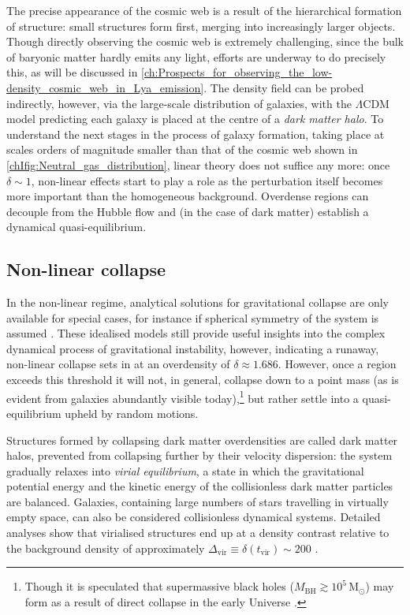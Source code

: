 The precise appearance of the cosmic web is a result of the hierarchical formation of structure: small structures form first, merging into increasingly larger objects. Though directly observing the cosmic web is extremely challenging, since the bulk of baryonic matter hardly emits any light, efforts are underway to do precisely this, as will be discussed in \cref{ch:Prospects_for_observing_the_low-density_cosmic_web_in_Lya_emission}. The density field can be probed indirectly, however, via the large-scale distribution of galaxies, with the $\Lambda$CDM model predicting each galaxy is placed at the centre of a \textit{dark matter halo}. To understand the next stages in the process of galaxy formation, taking place at scales orders of magnitude smaller than that of the cosmic web shown in \cref{chIfig:Neutral_gas_distribution}, linear theory does not suffice any more: once $\delta \sim 1$, non-linear effects start to play a role as the perturbation itself becomes more important than the homogeneous background. Overdense regions can decouple from the Hubble flow and (in the case of dark matter) establish a dynamical quasi-equilibrium.

\subsection{Non-linear collapse}
\label{chIssec:Non-linear_collapse}

In the non-linear regime, analytical solutions for gravitational collapse are only available for special cases, for instance if spherical symmetry of the system is assumed \citep[e.g.][]{1972ApJ...176....1G}. These idealised models still provide useful insights into the complex dynamical process of gravitational instability, however, indicating a runaway, non-linear collapse sets in at an overdensity of $\delta \approx 1.686$. However, once a region exceeds this threshold it will not, in general, collapse down to a point mass (as is evident from galaxies abundantly visible today),\footnote{Though it is speculated that supermassive black holes ($M_\text{BH} \gtrsim 10^5 \, \mathrm{M_\odot}$) may form as a result of direct collapse in the early Universe \citep[e.g.][]{2003ApJ...596...34B}.} but rather settle into a quasi-equilibrium upheld by random motions.

Structures formed by collapsing dark matter overdensities are called dark matter halos, prevented from collapsing further by their velocity dispersion: the system gradually relaxes into \textit{virial equilibrium}, a state in which the gravitational potential energy and the kinetic energy of the collisionless dark matter particles are balanced. Galaxies, containing large numbers of stars travelling in virtually empty space, can also be considered collisionless dynamical systems. Detailed analyses show that virialised structures end up at a density contrast relative to the background density of approximately $\Delta_\text{vir} \equiv \delta (t_\text{vir}) \sim 200$ \citep{1998ApJ...495...80B}.

